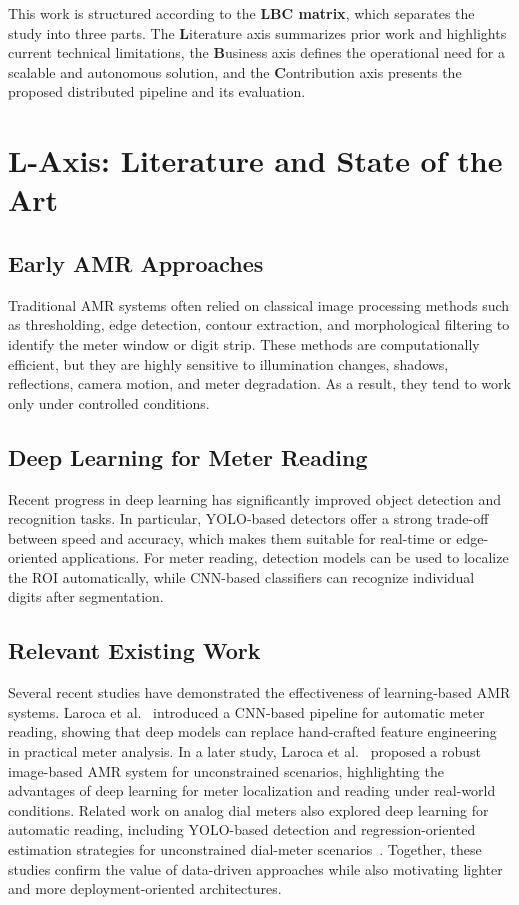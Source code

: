 \documentclass[11pt,a4paper]{article}
\begin{document}
This work is structured according to the \textbf{LBC matrix}, which separates the study into three parts. The \textbf{L}iterature axis summarizes prior work and highlights current technical limitations, the \textbf{B}usiness axis defines the operational need for a scalable and autonomous solution, and the \textbf{C}ontribution axis presents the proposed distributed pipeline and its evaluation.

\section{L-Axis: Literature and State of the Art}

\subsection{Early AMR Approaches}
Traditional AMR systems often relied on classical image processing methods such as thresholding, edge detection, contour extraction, and morphological filtering to identify the meter window or digit strip. These methods are computationally efficient, but they are highly sensitive to illumination changes, shadows, reflections, camera motion, and meter degradation. As a result, they tend to work only under controlled conditions.

\subsection{Deep Learning for Meter Reading}
Recent progress in deep learning has significantly improved object detection and recognition tasks. In particular, YOLO-based detectors offer a strong trade-off between speed and accuracy, which makes them suitable for real-time or edge-oriented applications. For meter reading, detection models can be used to localize the ROI automatically, while CNN-based classifiers can recognize individual digits after segmentation.

\subsection{Relevant Existing Work}
Several recent studies have demonstrated the effectiveness of learning-based AMR systems. Laroca et al.~\cite{laroca2019} introduced a CNN-based pipeline for automatic meter reading, showing that deep models can replace hand-crafted feature engineering in practical meter analysis. In a later study, Laroca et al.~\cite{laroca2021} proposed a robust image-based AMR system for unconstrained scenarios, highlighting the advantages of deep learning for meter localization and reading under real-world conditions. Related work on analog dial meters also explored deep learning for automatic reading, including YOLO-based detection and regression-oriented estimation strategies for unconstrained dial-meter scenarios~\cite{laroca2020dial}. Together, these studies confirm the value of data-driven approaches while also motivating lighter and more deployment-oriented architectures.
\end{document}
